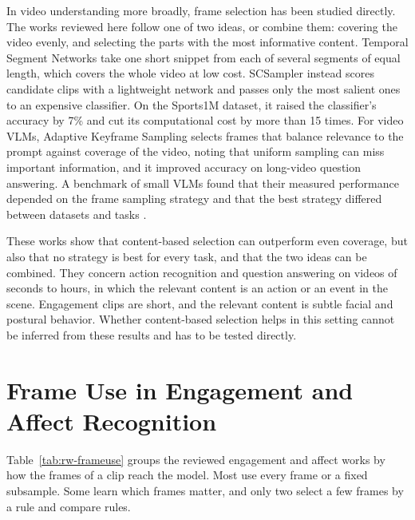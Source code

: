 In video understanding more broadly, frame selection has been studied directly. The works reviewed here follow one of two ideas, or combine them: covering the video evenly, and selecting the parts with the most informative content. Temporal Segment Networks \cite{wang2016} take one short snippet from each of several segments of equal length, which covers the whole video at low cost. SCSampler \cite{korbar2019} instead scores candidate clips with a lightweight network and passes only the most salient ones to an expensive classifier. On the Sports1M dataset, it raised the classifier's accuracy by 7\% and cut its computational cost by more than 15 times. For video VLMs, Adaptive Keyframe Sampling \cite{tang2025aks} selects frames that balance relevance to the prompt against coverage of the video, noting that uniform sampling can miss important information, and it improved accuracy on long-video question answering. A benchmark of small VLMs found that their measured performance depended on the frame sampling strategy and that the best strategy differed between datasets and tasks \cite{brkic2025}.

These works show that content-based selection can outperform even coverage, but also that no strategy is best for every task, and that the two ideas can be combined. They concern action recognition and question answering on videos of seconds to hours, in which the relevant content is an action or an event in the scene. Engagement clips are short, and the relevant content is subtle facial and postural behavior. Whether content-based selection helps in this setting cannot be inferred from these results and has to be tested directly.



\section{Frame Use in Engagement and Affect Recognition}
\label{sec:rw-frameuse}

Table~\ref{tab:rw-frameuse} groups the reviewed engagement and affect works by how the frames of a clip reach the model. Most use every frame or a fixed subsample. Some learn which frames matter, and only two select a few frames by a rule and compare rules.

